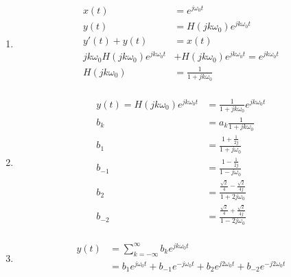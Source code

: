 \documentclass[10pt,a4paper, margin=1in]{article}
\begin{document}
\begin{enumerate}
\begin{enumerate}
     \\

    \item %
    \begin{align*}
        x(t) & = e^{j\omega_0t} \\
        y(t) & = H(jk\omega_0)e^{jk\omega_0t} \\
        y'(t) + y(t) & = x(t) \\
        jk\omega_0H(jk\omega_0)e^{jk\omega_0t} & + H(jk\omega_0)e^{jk\omega_0t} = e^{jk\omega_0t} \\
        H(jk\omega_0) & = \frac{1}{1 + jk\omega_0} \\
    \end{align*}
	\item %
    \begin{align*}
        y(t) = H(jk\omega_0)e^{jk\omega_0t} & = \frac{1}{1 + jk\omega_0}e^{jk\omega_0t} \\
        b_k & = a_k\frac{1}{1 + jk\omega_0} \\ 
        b_1 & = \frac{1 + \frac{1}{2j}}{1 + j\omega_0} \\
        b_{-1} & = \frac{1 - \frac{1}{2j}}{1 - j\omega_0} \\
        b_2 & = \frac{\frac{\sqrt{2}}{4} - \frac{\sqrt{2}}{4j}}{1 + 2j\omega_0} \\
        b_{-2} & = \frac{\frac{\sqrt{2}}{4} + \frac{\sqrt{2}}{4j}}{1 - 2j\omega_0} \\
    \end{align*}
    \item %
    \begin{align*}
        y(t) & = \sum_{k=-\infty}^{\infty} b_k e^{jk\omega_0t} \\
        & = b_1 e^{j\omega_0t} + b_{-1} e^{-j\omega_0t} + b_2 e^{j2\omega_0t} + b_{-2} e^{-j2\omega_0t} \\
    \end{align*}
    \end{enumerate}


\end{enumerate}
\end{document}
